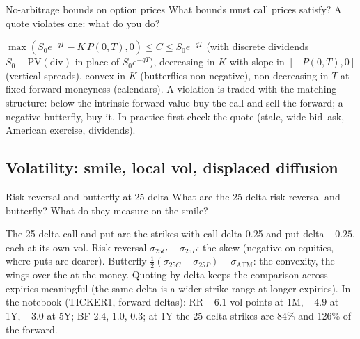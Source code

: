 \begin{question}{\Theory {}}{No-arbitrage bounds on option prices}
What bounds must call prices satisfy? A quote violates one: what do you do?
\end{question}
\begin{answer}
$\max(S_0e^{-qT} - K\,P(0,T), 0) \le C \le S_0e^{-qT}$ (with discrete dividends $S_0 - \mathrm{PV}(\text{div})$ in
place of $S_0e^{-qT}$), decreasing in $K$ with slope in $[-P(0,T), 0]$ (vertical spreads), convex in $K$ (butterflies
non-negative), non-decreasing in $T$ at fixed forward moneyness (calendars). A violation is traded with the matching
structure: below the intrinsic forward value buy the call and sell the forward; a negative butterfly, buy it. In
practice first check the quote (stale, wide bid--ask, American exercise, dividends).
\end{answer}

\subsection{Volatility: smile, local vol, displaced diffusion}

\begin{question}{\Theory \Practice {}}{Risk reversal and butterfly at 25 delta}
What are the 25-delta risk reversal and butterfly? What do they measure on the smile?
\end{question}
\begin{answer}
The 25-delta call and put are the strikes with call delta 0.25 and put delta $-0.25$, each at its own vol. Risk
reversal $\sigma_{25C} - \sigma_{25P}$: the skew (negative on equities, where puts are dearer). Butterfly
$\tfrac12(\sigma_{25C} + \sigma_{25P}) - \sigma_{\text{ATM}}$: the convexity, the wings over the at-the-money. Quoting
by delta keeps the comparison across expiries meaningful (the same delta is a wider strike range at longer
expiries). In the notebook (TICKER1, forward deltas): RR $-6.1$ vol points at 1M, $-4.9$ at 1Y, $-3.0$ at 5Y; BF 2.4,
1.0, 0.3; at 1Y the 25-delta strikes are 84\% and 126\% of the forward.
\end{answer}

